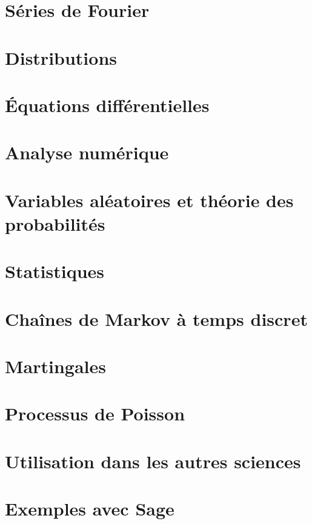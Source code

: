\chapter{Séries de Fourier}



\chapter{Distributions}


\chapter{Équations différentielles}



\chapter{Analyse numérique}


\chapter{Variables aléatoires et théorie des probabilités}




\chapter{Statistiques}


\chapter{Chaînes de Markov à temps discret}


\chapter{Martingales}


\chapter{Processus de Poisson}


\chapter{Utilisation dans les autres sciences}


\chapter{Exemples avec Sage}


%

 
